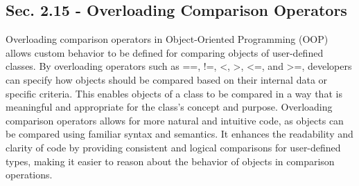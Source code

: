 \subsection*{Sec. 2.15 - Overloading Comparison Operators}

Overloading comparison operators in Object-Oriented Programming (OOP) allows custom behavior to be defined for comparing objects of user-defined classes. By overloading operators such as ==, !=, <, >, <=, and >=, developers can specify how objects should be compared based on their internal data or specific criteria. This 
enables objects of a class to be compared in a way that is meaningful and appropriate for the class's concept and purpose. Overloading comparison operators allows for more natural and intuitive code, as objects can be compared using familiar syntax and semantics. It enhances the readability and clarity of code by providing 
consistent and logical comparisons for user-defined types, making it easier to reason about the behavior of objects in comparison operations.

